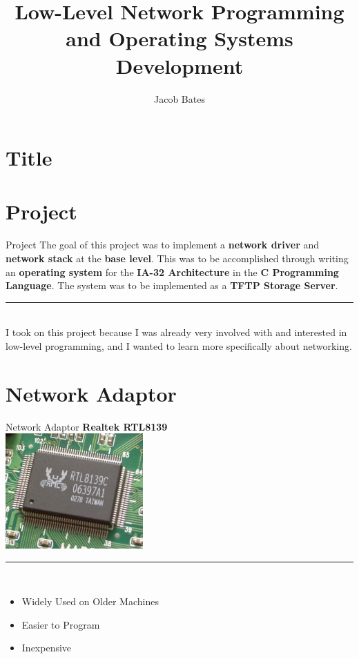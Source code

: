\documentclass{beamer}
\title{Low-Level Network Programming and Operating Systems Development}
\author{Jacob Bates}
\institute{Da Vinci Science High School}
\begin{document}
\section{Title}

    \begin{frame}
        \titlepage
    \end{frame}

\section{Project}

    \begin{frame}{Project}
        The goal of this project was to implement a \textbf{network driver} and \textbf{network stack} at the \textbf{base level}.
        This was to be accomplished through writing an \textbf{operating system} for the \textbf{IA-32 Architecture} in the \textbf{C Programming Language}.
        The system was to be implemented as a \textbf{TFTP Storage Server}.\\
        \rule{0.5\textwidth}{0.5pt}\\
        I took on this project because I was already very involved with and interested in low-level programming, and I wanted to learn more specifically about networking.
    \end{frame}

\section{Network Adaptor}

    \begin{frame}{Network Adaptor}
        \textbf{Realtek RTL8139}\\
        \includegraphics[height=125pt]{Realtek_RTL8139C.jpg}\\
        \rule{0.5\textwidth}{0.5pt}\\
        \begin{itemize}
            \item Widely Used on Older Machines
            \item Easier to Program
            \item Inexpensive
        \end{itemize}
    \end{frame}
\end{document}
